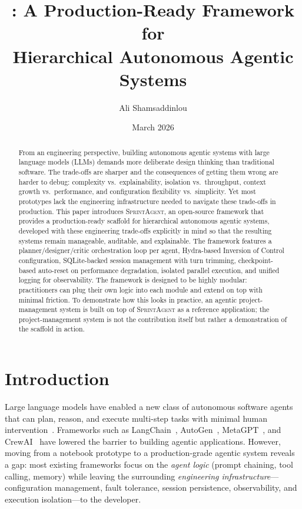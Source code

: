 \documentclass[11pt, a4paper]{article}
\title{%
  \sprintagent{}: A Production-Ready Framework for\\
  Hierarchical Autonomous Agentic Systems%
}
\author{Ali Shamsaddinlou}
\date{March 2026}
\newcommand{\sprintagent}{\textsc{SprintAgent}}
\newcommand{\ioc}{Inversion of Control}
\begin{document}
\maketitle

\begin{abstract}
From an engineering perspective, building autonomous agentic systems
with large language models (LLMs) demands more deliberate design
thinking than traditional software.  The trade-offs are sharper and
the consequences of getting them wrong are harder to debug: complexity
vs.\ explainability, isolation vs.\ throughput, context growth vs.\
performance, and configuration flexibility vs.\ simplicity.  Yet most
prototypes lack the engineering infrastructure needed to navigate these
trade-offs in production.  This paper introduces \sprintagent{}, an
open-source framework that provides a production-ready scaffold for
hierarchical autonomous agentic systems, developed with these
engineering trade-offs explicitly in mind so that the resulting systems
remain manageable, auditable, and explainable.  The framework features
a planner/designer/critic orchestration loop per agent, Hydra-based
\ioc{} configuration, SQLite-backed session management with turn
trimming, checkpoint-based auto-reset on performance degradation,
isolated parallel execution, and unified logging for observability.
The framework is designed to be highly modular: practitioners can plug
their own logic into each module and extend on top with minimal
friction.  To demonstrate how this looks in practice, an agentic
project-management system is built on top of \sprintagent{} as a
reference application; the project-management system is not the
contribution itself but rather a demonstration of the scaffold in
action.
\end{abstract}

\section{Introduction}
\label{sec:introduction}

Large language models have enabled a new class of autonomous software
agents that can plan, reason, and execute multi-step tasks with minimal
human intervention~\cite{wang2024survey, xi2023rise}.  Frameworks such as
LangChain~\cite{chase2023langchain}, AutoGen~\cite{wu2023autogen},
MetaGPT~\cite{hong2023metagpt}, and CrewAI~\cite{crewai2024} have
lowered the barrier to building agentic applications.  However, moving
from a notebook prototype to a production-grade agentic system reveals
a gap: most existing frameworks focus on the \emph{agent logic} (prompt
chaining, tool calling, memory) while leaving the surrounding
\emph{engineering infrastructure}---configuration management, fault
tolerance, session persistence, observability, and execution
isolation---to the developer.
\end{document}
